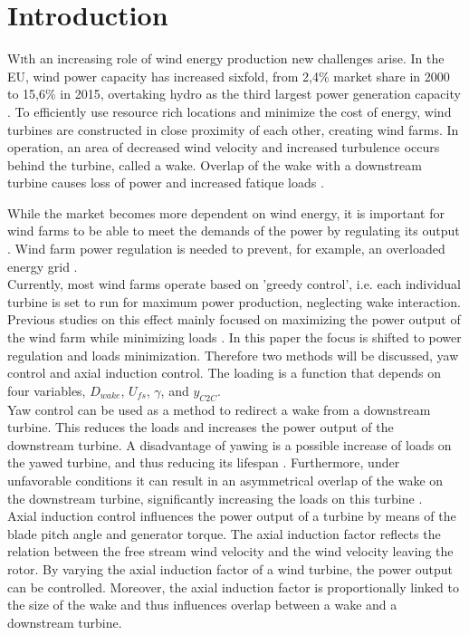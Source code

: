 \section{Introduction}
\lettrine[nindent=0em,lines=3]
With an increasing role of wind energy production new challenges arise\cite{Nat2016}. In the EU, wind power capacity has increased sixfold, from 2,4\% market share in 2000 to 15,6\% in 2015, overtaking hydro as the third largest power generation capacity \cite{EWEA2016}. To efficiently use resource rich locations and minimize the cost of energy, wind turbines are constructed in close proximity of each other, creating wind farms. In operation, an area of decreased wind velocity and increased turbulence occurs behind the turbine, called a wake. Overlap of the wake with a downstream turbine causes loss of power and increased fatique loads \cite{Boersma2017, Wilson2017, Dijk2016, Fleming2014, Zalkind2016}. 

While the market becomes more dependent on wind energy, it is important for wind farms to be able to meet the demands of the power by regulating its output \cite{Tande2003}. Wind farm power regulation is needed to prevent, for example, an overloaded energy grid \cite{Hansen2014}.  \\
\indent Currently, most wind farms operate based on 'greedy control', i.e. each individual turbine is set to run for maximum power production, neglecting wake interaction. Previous studies on this effect mainly focused on maximizing the power output of the wind farm while minimizing loads \cite{Dijk2016, vanDijk2016, Wilson2017}. In this paper the focus is shifted to power regulation and loads minimization. Therefore two methods will be discussed, yaw control and axial induction control. The loading is a function that depends on four variables, $D_{wake}$, $U_{fs}$, $\gamma$, and $y _{C2C}$. \\
\indent Yaw control can be used as a method to redirect a wake from a downstream turbine. This reduces the loads and increases the power output of the downstream turbine. A disadvantage of yawing is a possible increase of loads on the yawed turbine, and thus reducing its lifespan \cite{Zalkind2016,Kanev2017}. Furthermore, under unfavorable conditions it can result in an asymmetrical overlap of the wake on the downstream turbine, significantly increasing the loads on this turbine \cite{Wilson2017,Dijk2016}. \\
\indent Axial induction control influences the power output of a turbine by means of the blade pitch angle and generator torque. The axial induction factor reflects the relation between the free stream wind velocity and the wind velocity leaving the rotor. By varying the axial induction factor of a wind turbine, the power output can be controlled. Moreover, the axial induction factor is proportionally linked to the size of the wake and thus influences overlap between a wake and a downstream turbine.  

